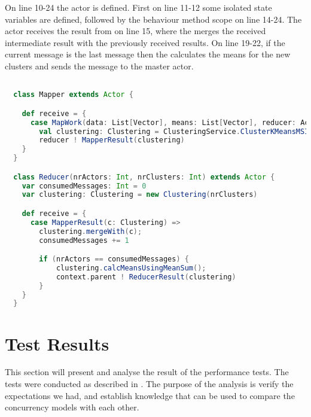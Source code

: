 On line 10-24 the  actor is defined. First on line 11-12 some isolated state variables are defined, followed by the behaviour method scope on line 14-24.
The  actor receives the result from  on line 15, where the  merges the received intermediate result with the previously received results. On line 19-22, if the current message is the last message then the  calculates the means for the new clusters and sends the  message to the master actor.

\begin{lstlisting}[float,label=lst:actor_implementation,
  caption={Actor Implementation},
  language=Scala,  
  showspaces=false,
  showtabs=false,
  breaklines=true,
  showstringspaces=false,
  breakatwhitespace=true,
  commentstyle=\color{greencomments},
  keywordstyle=\color{bluekeywords},
  stringstyle=\color{redstrings}]  % Start your code-block

  class Mapper extends Actor {

    def receive = {
      case MapWork(data: List[Vector], means: List[Vector], reducer: ActorRef) =>
        val clustering: Clustering = ClusteringService.ClusterKMeansMSIncremental(data, means)
        reducer ! MapperResult(clustering)
    }
  }

  class Reducer(nrActors: Int, nrClusters: Int) extends Actor {
    var consumedMessages: Int = 0
    var clustering: Clustering = new Clustering(nrClusters)

    def receive = {
      case MapperResult(c: Clustering) =>
        clustering.mergeWith(c);
        consumedMessages += 1

        if (nrActors == consumedMessages) {
            clustering.calcMeansUsingMeanSum();
            context.parent ! ReducerResult(clustering)
        }
    }
  }  
\end{lstlisting}

\section{Test Results}
This section will present and analyse the result of the performance tests. The tests were conducted as described in . The purpose of the analysis is verify the expectations we had, and establish knowledge that can be used to compare the concurrency models with each other.

